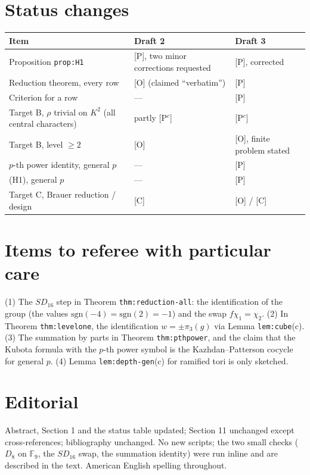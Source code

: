 \documentclass[11pt]{article}
\newcommand{\F}{\mathbb F}
\begin{document}
\section*{Status changes}
\begin{center}
\begin{tabular}{lll}
\toprule
Item & Draft 2 & Draft 3\\
\midrule
Proposition \texttt{prop:H1} & [P], two minor corrections requested & [P], corrected\\
Reduction theorem, every row & [O] (claimed ``verbatim'') & [P]\\
Criterion for a row & --- & [P]\\
Target B, $\rho$ trivial on $K^2$ (all central characters) & partly [P$^c$] & [P$^c$]\\
Target B, level $\ge2$ & [O] & [O], finite problem stated\\
$p$-th power identity, general $p$ & --- & [P]\\
(H1), general $p$ & --- & [P]\\
Target C, Brauer reduction / design & [C] & [O] / [C]\\
\bottomrule
\end{tabular}
\end{center}

\section*{Items to referee with particular care}
(1) The $SD_{16}$ step in Theorem \texttt{thm:reduction-all}: the
identification of the group (the values $\mathrm{sgn}(-4)=\mathrm{sgn}(2)=-1$)
and the swap $f\chi_1=\chi_2$.  (2) In Theorem \texttt{thm:levelone}, the
identification $w=\pm\pi_3(g)$ via Lemma \texttt{lem:cube}(c).  (3) The
summation by parts in Theorem \texttt{thm:pthpower}, and the claim that
the Kubota formula with the $p$-th power symbol is the Kazhdan--Patterson
cocycle for general $p$.  (4) Lemma \texttt{lem:depth-gen}(c) for ramified
tori is only sketched.

\section*{Editorial}
Abstract, Section 1 and the status table updated; Section 11 unchanged
except cross-references; bibliography unchanged.  No new scripts; the two
small checks ($D_8$ on $\F_9$, the $SD_{16}$ swap, the summation identity)
were run inline and are described in the text.  American English
spelling throughout.
\end{document}
